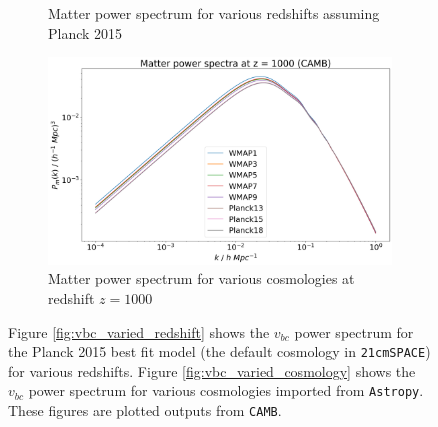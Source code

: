 \documentclass[floats,floatfix,showpacs,amssymb,prd,superscriptaddress,nofootinbib]{revtex4-2} %
\newcommand{\code}{\texttt}
\begin{document}
\begin{figure}[!htbp]
\begin{subfigure}{0.45\textwidth}
         \caption{Matter power spectrum for various redshifts assuming Planck 2015}
         \label{fig:matter_power_spectrum_varied_redshift}
     \end{subfigure}
     \hfill
     \begin{subfigure}{0.45\textwidth}
         \centering
         \includegraphics[width=\textwidth]{images/matter_power_spectrum_varied_cosmology.png}
         \caption{Matter power spectrum for various cosmologies at redshift $z = 1000$}
         \label{fig:matter_power_spectrum_varied_cosmology}
     \end{subfigure}
    \caption{Figure \ref{fig:vbc_varied_redshift} shows the $v_{bc}$ power spectrum for the Planck 2015 best fit model (the default cosmology in \code{21cmSPACE}) for various redshifts. Figure \ref{fig:vbc_varied_cosmology} shows the $v_{bc}$ power spectrum for various cosmologies imported from \code{Astropy}. These figures are plotted outputs from \code{CAMB}.}
    \label{fig:camb_output_plots}
\end{figure}
\end{document}
